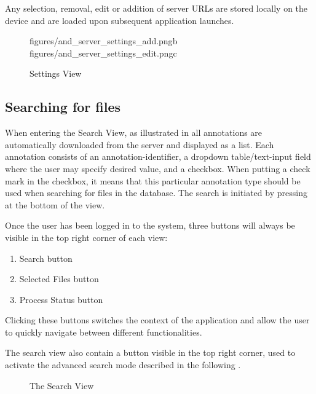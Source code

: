 Any selection, removal, edit or addition of server URLs are stored locally on the device and
are loaded upon subsequent application launches.


\begin{figure}[h]
		{figures/and_server_settings_add.png}{b}
		{figures/and_server_settings_edit.png}{c}
\caption{Settings View}
\label{fig:and_settings_man}
\end{figure}
\FloatBarrier


\subsection{Searching for files}\label{sec:and_search}

When entering the Search View, as illustrated in  all annotations are automatically
downloaded from the server and displayed as a list. Each annotation consists of an annotation-identifier,
a dropdown table/text-input field where the user may specify desired value, and a checkbox. When putting
a check mark in the checkbox, it means that this particular annotation type should be used when searching
for files in the database. The search is initiated by pressing  at the bottom of the view.

Once the user has been logged in to the system, three buttons will always be visible in the top right corner of each view:
\begin{enumerate}
\item Search button
\item Selected Files button
\item Process Status button
\end{enumerate}

Clicking these buttons switches the context of the application and allow the user to quickly navigate between different functionalities.

The search view also contain a button visible in the top right corner, used to activate the advanced search mode described in the following . 

\begin{figure}[h]
\caption{The Search View}
\label{fig:and_search_man}
\end{figure}
\FloatBarrier


